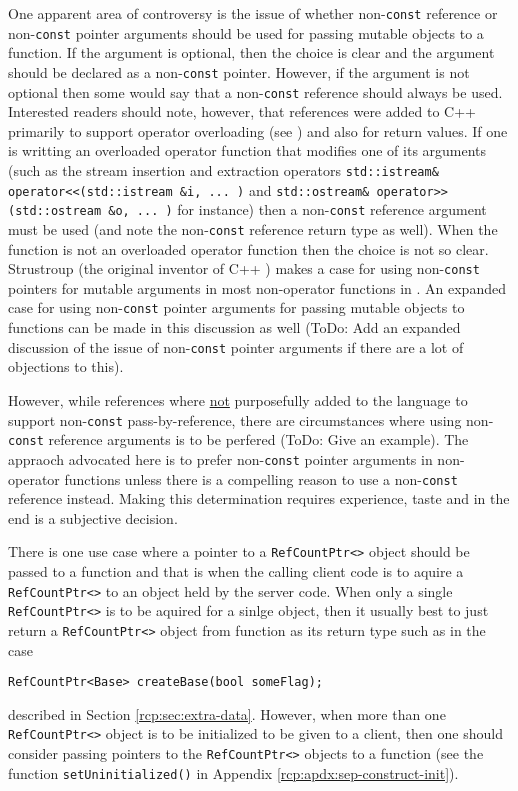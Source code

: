 One apparent area of controversy is the issue of whether
non-\texttt{const} reference or non-\texttt{const} pointer arguments
should be used for passing mutable objects to a function.  If the
argument is optional, then the choice is clear and the argument should
be declared as a non-\texttt{const} pointer.  However, if the argument
is not optional then some would say that a non-\texttt{const}
reference should always be used.  Interested readers should note,
however, that references were added to C++ primarily to support
operator overloading (see {}\cite[Section 3.7]{ref:design_evol_cpp})
and also for return values.  If one is writting an overloaded operator
function that modifies one of its arguments (such as the stream
insertion and extraction operators {}\texttt{std::istream\&
operator<<(std::istream
\&i, ... )} and {}\texttt{std::ostream\& operator>>(std::ostream \&o,
... )} for instance) then a non-\texttt{const} reference argument must
be used (and note the non-\texttt{const} reference return type as
well).  When the function is not an overloaded operator function then
the choice is not so clear.  Strustroup (the original inventor of C++
{}\cite{ref:design_evol_cpp}) makes a case for using
non-\texttt{const} pointers for mutable arguments in most non-operator
functions in {}\cite[Section 5.5]{ref:stroustrup_2000}.  An expanded
case for using non-\texttt{const} pointer arguments for passing
mutable objects to functions can be made in this discussion as well
(ToDo: Add an expanded discussion of the issue of non-\texttt{const}
pointer arguments if there are a lot of objections to this).

However, while references where {}\underline{not} purposefully added
to the language to support non-\texttt{const} pass-by-reference, there
are circumstances where using non-\texttt{const} reference arguments
is to be perfered (ToDo: Give an example).  The appraoch advocated
here is to prefer non-\texttt{const} pointer arguments in non-operator
functions unless there is a compelling reason to use a
non-\texttt{const} reference instead.  Making this determination
requires experience, taste and in the end is a subjective decision.

There is one use case where a pointer to a {}\texttt{RefCountPtr<>}
object should be passed to a function and that is when the calling
client code is to aquire a {}\texttt{RefCountPtr<>} to an object held
by the server code.  When only a single {}\texttt{RefCountPtr<>} is to
be aquired for a sinlge object, then it usually best to just return
a {}\texttt{RefCountPtr<>} object from function as its return type
such as in the case
%
{\scriptsize\begin{verbatim}
RefCountPtr<Base> createBase(bool someFlag);
\end{verbatim}}
%
{}\noindent{}described in Section {}\ref{rcp:sec:extra-data}.
However, when more than one {}\texttt{RefCountPtr<>} object is to be
initialized to be given to a client, then one should consider passing
pointers to the {}\texttt{RefCountPtr<>} objects to a function (see
the function {}\texttt{setUninitialized()} in Appendix
{}\ref{rcp:apdx:sep-construct-init}).
